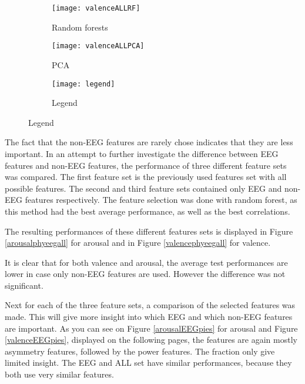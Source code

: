 \begin{figure}[!tbp]
  \begin{subfigure}[b]{0.3\textwidth}
    \texttt{[image: valenceALLRF]}
    \caption{Random forests}
  \end{subfigure}
  \hfill
  \begin{subfigure}[b]{0.3\textwidth}
    \texttt{[image: valenceALLPCA]} %
    \caption{PCA}
  \end{subfigure}
  \hfill
  \begin{subfigure}[b]{0.3\textwidth}
    \texttt{[image: legend]}
    \caption{Legend\label{valencepieslegend}}
  \end{subfigure}
\end{figure}
\clearpage

The fact that the non-EEG features are rarely chose indicates that they are less important. In an attempt to further investigate the difference between EEG features and non-EEG features, the performance of three different feature sets was compared. The first feature set is the previously used features set with all possible features. The second and third feature sets contained only EEG and non-EEG features respectively. The feature selection was done with random forest, as this method had the best average performance, as well as the best correlations. 

\npar

The resulting performances of these different features sets is displayed in Figure \ref{arousalphyeegall} for arousal and in Figure \ref{valencephyeegall} for valence.



It is clear that for both valence and arousal, the average test performances are lower in case only non-EEG features are used. However the difference was not significant. %

\npar 

Next for each of the three feature sets, a comparison of the selected features was made. This will give more insight into which EEG and which non-EEG features are important. As you can see on Figure \ref{arousalEEGpies} for arousal and Figure \ref{valenceEEGpies}, displayed on the following pages, the features are again mostly asymmetry features, followed by the power features. The fraction only give limited insight. The EEG and ALL set have similar performances, because they both use very similar features.

